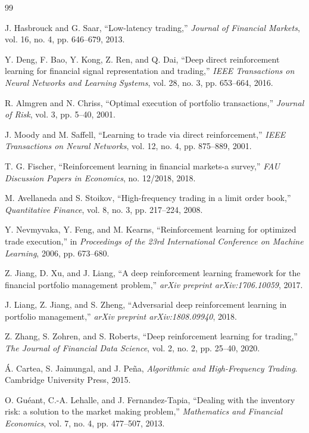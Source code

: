 \documentclass[11pt,a4paper]{article}
\begin{document}
\begin{thebibliography}{99}

J. Hasbrouck and G. Saar, ``Low-latency trading,'' \emph{Journal of Financial Markets}, vol. 16, no. 4, pp. 646--679, 2013.

Y. Deng, F. Bao, Y. Kong, Z. Ren, and Q. Dai, ``Deep direct reinforcement learning for financial signal representation and trading,'' \emph{IEEE Transactions on Neural Networks and Learning Systems}, vol. 28, no. 3, pp. 653--664, 2016.

R. Almgren and N. Chriss, ``Optimal execution of portfolio transactions,'' \emph{Journal of Risk}, vol. 3, pp. 5--40, 2001.

J. Moody and M. Saffell, ``Learning to trade via direct reinforcement,'' \emph{IEEE Transactions on Neural Networks}, vol. 12, no. 4, pp. 875--889, 2001.

T. G. Fischer, ``Reinforcement learning in financial markets-a survey,'' \emph{FAU Discussion Papers in Economics}, no. 12/2018, 2018.

M. Avellaneda and S. Stoikov, ``High-frequency trading in a limit order book,'' \emph{Quantitative Finance}, vol. 8, no. 3, pp. 217--224, 2008.

Y. Nevmyvaka, Y. Feng, and M. Kearns, ``Reinforcement learning for optimized trade execution,'' in \emph{Proceedings of the 23rd International Conference on Machine Learning}, 2006, pp. 673--680.

Z. Jiang, D. Xu, and J. Liang, ``A deep reinforcement learning framework for the financial portfolio management problem,'' \emph{arXiv preprint arXiv:1706.10059}, 2017.

J. Liang, Z. Jiang, and S. Zheng, ``Adversarial deep reinforcement learning in portfolio management,'' \emph{arXiv preprint arXiv:1808.09940}, 2018.

Z. Zhang, S. Zohren, and S. Roberts, ``Deep reinforcement learning for trading,'' \emph{The Journal of Financial Data Science}, vol. 2, no. 2, pp. 25--40, 2020.

{\'A}. Cartea, S. Jaimungal, and J. Pe{\~n}a, \emph{Algorithmic and High-Frequency Trading}. Cambridge University Press, 2015.

O. Gu{\'e}ant, C.-A. Lehalle, and J. Fernandez-Tapia, ``Dealing with the inventory risk: a solution to the market making problem,'' \emph{Mathematics and Financial Economics}, vol. 7, no. 4, pp. 477--507, 2013.


\end{thebibliography}
\end{document}

